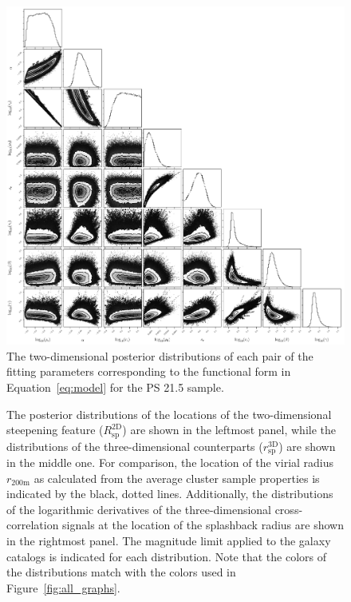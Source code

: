\documentclass[iop, apjl, twocolappendix, numberedappendix]{emulateapj}
\begin{document}
\begin{figure}
    \includegraphics[width= \textwidth]{corner215.pdf}
\caption{The two-dimensional posterior distributions of each pair of
the fitting parameters corresponding to the functional
form in Equation~\ref{eq:model} for the PS 21.5 sample.
}
   \label{fig:corner_21.5}
\end{figure}

\begin{figure}
\caption{The posterior distributions of the
locations of the two-dimensional steepening feature
($R_{\mathrm{sp}}^{\mathrm{2D}}$) are shown in the leftmost panel, while the
distributions of the three-dimensional counterparts
($r_{\mathrm{sp}}^{\mathrm{3D}}$) are shown in the middle one.
For comparison, the location of the virial
radius $r_{\mathrm{200m}}$ as calculated from the average cluster
sample properties is indicated by the black, dotted lines.
Additionally, the distributions of the logarithmic derivatives of
the three-dimensional cross-correlation signals at the location of
the splashback radius are shown in the rightmost panel.
The magnitude limit applied to the galaxy catalogs is indicated for each
distribution. Note that the colors of the distributions match with
the colors used in Figure~\ref{fig:all_graphs}. }
   \label{fig:histograms}
\end{figure}
\end{document}
